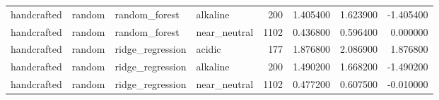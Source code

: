 \begin{longtable}{llllrrrr}
handcrafted & random & random\_forest & alkaline & 200 & 1.405400 & 1.623900 & -1.405400 \\
handcrafted & random & random\_forest & near\_neutral & 1102 & 0.436800 & 0.596400 & 0.000000 \\
handcrafted & random & ridge\_regression & acidic & 177 & 1.876800 & 2.086900 & 1.876800 \\
handcrafted & random & ridge\_regression & alkaline & 200 & 1.490200 & 1.668200 & -1.490200 \\
handcrafted & random & ridge\_regression & near\_neutral & 1102 & 0.477200 & 0.607500 & -0.010000 \\
\end{longtable}
